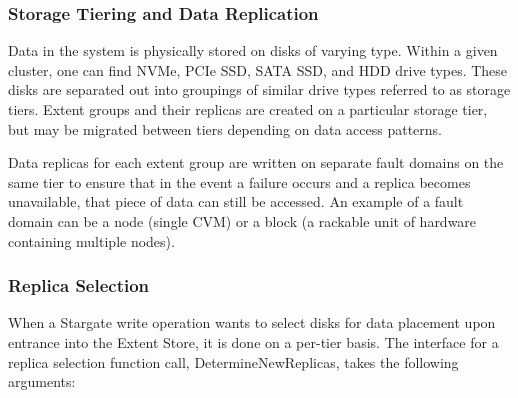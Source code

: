 \documentclass[12pt]{article}
\begin{document}
    \subsubsection{Storage Tiering and Data Replication}

    Data in the system is physically stored on disks of varying type. Within a
    given cluster, one can find NVMe, PCIe SSD, SATA SSD, and HDD drive types.
    These disks are separated out into groupings of similar drive types
    referred to as storage tiers. Extent groups and their replicas are created
    on a particular storage tier, but may be migrated between tiers depending
    on data access patterns.

    Data replicas for each extent group are written on separate fault domains
    on the same tier to ensure that in the event a failure occurs and a
    replica becomes unavailable, that piece of data can still be accessed. An
    example of a fault domain can be a node (single CVM) or a block (a rackable
    unit of hardware containing multiple nodes). 

    \subsubsection{Replica Selection}

    When a Stargate write operation wants to select disks for data placement
    upon entrance into the Extent Store, it is done on a per-tier basis. The
    interface for a replica selection function call, DetermineNewReplicas,
    takes the following arguments:
\end{document}
